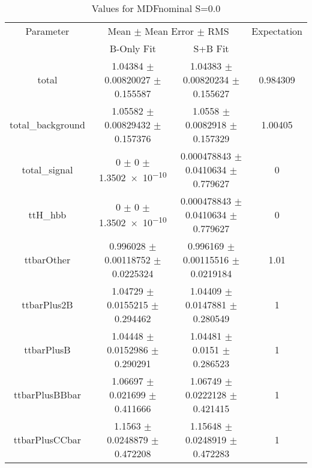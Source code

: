 \begin{table}
\centering
\caption{Values for MDFnominal S=0.0}
\begin{tabular}{cccc}
\toprule
Parameter & \multicolumn{2}{c}{Mean $\pm$ Mean Error $\pm$ RMS} & Expectation\\
 & B-Only Fit & S+B Fit & \\
\midrule
total & \num{1.04384} $\pm$ \num{0.00820027} $\pm$ \num{0.155587} & \num{1.04383} $\pm$ \num{0.00820234} $\pm$ \num{0.155627} & \num{0.984309}\\
total\_background & \num{1.05582} $\pm$ \num{0.00829432} $\pm$ \num{0.157376} & \num{1.0558} $\pm$ \num{0.0082918} $\pm$ \num{0.157329} & \num{1.00405}\\
total\_signal & \num{0} $\pm$ \num{0} $\pm$ \num{1.3502e-10} & \num{0.000478843} $\pm$ \num{0.0410634} $\pm$ \num{0.779627} & \num{0}\\
ttH\_hbb & \num{0} $\pm$ \num{0} $\pm$ \num{1.3502e-10} & \num{0.000478843} $\pm$ \num{0.0410634} $\pm$ \num{0.779627} & \num{0}\\
ttbarOther & \num{0.996028} $\pm$ \num{0.00118752} $\pm$ \num{0.0225324} & \num{0.996169} $\pm$ \num{0.00115516} $\pm$ \num{0.0219184} & \num{1.01}\\
ttbarPlus2B & \num{1.04729} $\pm$ \num{0.0155215} $\pm$ \num{0.294462} & \num{1.04409} $\pm$ \num{0.0147881} $\pm$ \num{0.280549} & \num{1}\\
ttbarPlusB & \num{1.04448} $\pm$ \num{0.0152986} $\pm$ \num{0.290291} & \num{1.04481} $\pm$ \num{0.0151} $\pm$ \num{0.286523} & \num{1}\\
ttbarPlusBBbar & \num{1.06697} $\pm$ \num{0.021699} $\pm$ \num{0.411666} & \num{1.06749} $\pm$ \num{0.0222128} $\pm$ \num{0.421415} & \num{1}\\
ttbarPlusCCbar & \num{1.1563} $\pm$ \num{0.0248879} $\pm$ \num{0.472208} & \num{1.15648} $\pm$ \num{0.0248919} $\pm$ \num{0.472283} & \num{1}\\
\bottomrule
\end{tabular}
\end{table}